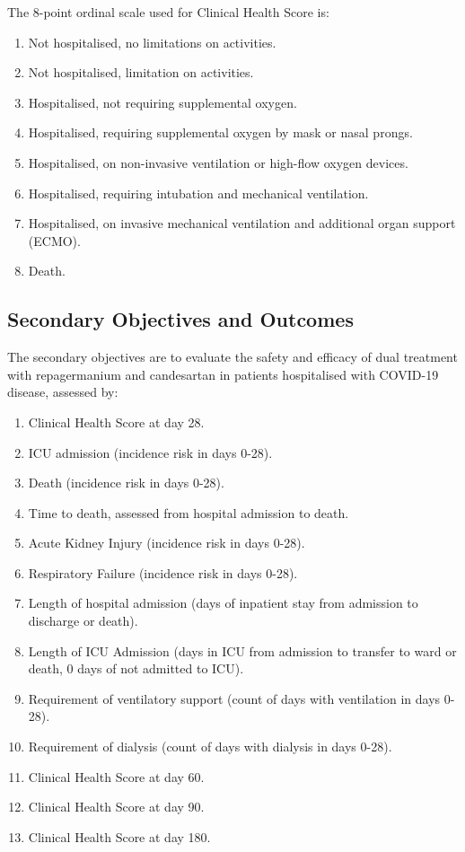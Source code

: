\documentclass[11pt,parskip=half-]{scrartcl}
\begin{document}
The 8-point ordinal scale used for Clinical Health Score is:
\begin{enumerate}[nolistsep]
    \item Not hospitalised, no limitations on activities.
    \item Not hospitalised, limitation on activities.
    \item Hospitalised, not requiring supplemental oxygen.
    \item Hospitalised, requiring supplemental oxygen by mask or nasal prongs.
    \item  Hospitalised, on non-invasive ventilation or high-flow oxygen devices.
    \item Hospitalised, requiring intubation and mechanical ventilation.
    \item Hospitalised, on invasive mechanical ventilation and additional organ support (ECMO).
    \item Death.
\end{enumerate}

\subsection{Secondary Objectives and Outcomes}
The secondary objectives are to evaluate the safety and efficacy of dual treatment with repagermanium and candesartan in patients hospitalised with COVID-19 disease, assessed by:
\begin{enumerate}
    \item Clinical Health Score at day 28.
    \item ICU admission (incidence risk in days 0-28).
    \item Death (incidence risk in days 0-28).
    \item Time to death, assessed from hospital admission to death.
    \item Acute Kidney Injury (incidence risk in days 0-28).
    \item Respiratory Failure (incidence risk in days 0-28).
    \item Length of hospital admission (days of inpatient stay from admission to discharge or death).
    \item Length of ICU Admission (days in ICU from admission to transfer to ward or death, 0 days of not admitted to ICU).
    \item Requirement of ventilatory support (count of days with ventilation in days 0-28).
    \item Requirement of dialysis (count of days with dialysis in days 0-28).
    \item Clinical Health Score at day 60.
    \item Clinical Health Score at day 90.
    \item Clinical Health Score at day 180.
\end{enumerate}
\end{document}
